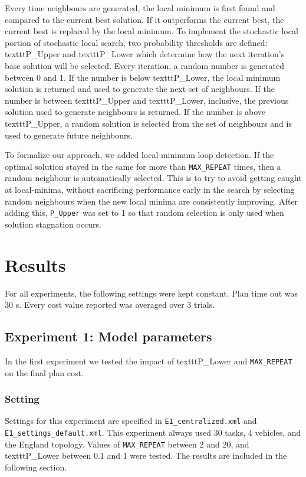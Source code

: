\documentclass[11pt]{article}
\begin{document}
Every time neighbours are generated, the local minimum is first found and compared to the current best solution. If it outperforms the current best, the current best is replaced by the local minimum. To implement the stochastic local portion of stochastic local search, two probability thresholds are defined: texttt{P\_Upper} and texttt{P\_Lower} which determine how the next iteration's base solution will be selected. Every iteration, a random number is generated between 0 and 1. If the number is below texttt{P\_Lower}, the local minimum solution is returned and used to generate the next set of neighbours. If the number is between texttt{P\_Upper} and texttt{P\_Lower}, inclusive, the previous solution used to generate neighbours is returned. If the number is above texttt{P\_Upper}, a random solution is selected from the set of neighbours and is used to generate future neighbours. 

To formalize our approach, we added local-minimum loop detection. If the optimal solution stayed in the same for more than \texttt{MAX\_REPEAT} times, then a random neighbour is automatically selected. This is to try to avoid getting caught at local-minima, without sacrificing performance early in the search by selecting random neighbours when the new local minima are consistently improving. After adding this, \texttt{P\_Upper} was set to 1 so that random selection is only used when solution stagnation occurs.

\section{Results}
For all experiments, the following settings were kept constant. Plan time out was 30 s. Every cost value reported was averaged over 3 trials. 
\subsection{Experiment 1: Model parameters}
In the first experiment we tested the impact of texttt{P\_Lower} and \texttt{MAX\_REPEAT} on the final plan cost.
\subsubsection{Setting}
Settings for this experiment are specified in \texttt{E1\_centralized.xml} and \texttt{E1\_settings\_default.xml}. This experiment always used 30 tasks, 4 vehicles, and the England topology. Values of \texttt{MAX\_REPEAT} between 2 and 20, and texttt{P\_Lower} between 0.1 and 1 were tested. The results are included in the following section. 
\end{document}
